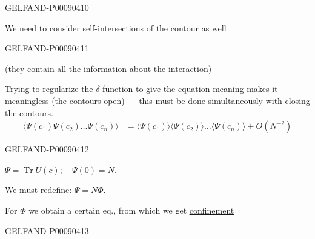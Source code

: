 \begin{GelfandAdjacentEvidence}{GELFAND-P000904}{10}

We need to consider self-intersections of the contour as well
\end{GelfandAdjacentEvidence}
\begin{GelfandAdjacentEvidence}{GELFAND-P000904}{11}


(they contain all the information about the interaction)

Trying to regularize the $\delta$-function to give the equation meaning makes it meaningless (the contours open) --- this must be done simultaneously with closing the contours.
\begin{equation*}
\begin{aligned}
\langle\Psi(c_1)\Psi(c_2)\ldots\Psi(c_n)\rangle
&=\langle\Psi(c_1)\rangle\langle\Psi(c_2)\rangle\ldots
\langle\Psi(c_n)\rangle+O(N^{-2})
\end{aligned}
\tag{35}
\end{equation*}
\end{GelfandAdjacentEvidence}
\begin{GelfandAdjacentEvidence}{GELFAND-P000904}{12}


$\Psi=\operatorname{Tr}U(c);\quad\Psi(0)=N.$

We must redefine: $\Psi=N\bar\Phi$.

For $\bar\Phi$ we obtain a certain eq., from which we get \underline{\underline{confinement}}

\end{GelfandAdjacentEvidence}
\begin{GelfandAdjacentEvidence}{GELFAND-P000904}{13}

\end{GelfandAdjacentEvidence}



